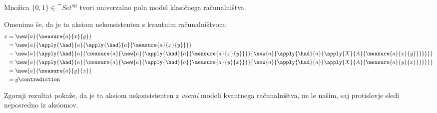 \begin{proposition}
    Množica \(\{0,1\} ∈ \cat{Set}^{\textrm{op}}\) tvori univerzalno poln model klasičnega računalništva.
\end{proposition}

Omenimo še, da je ta aksiom nekonsistenten s kvantnim računalništvom:
\begin{align*}
    x &= \new{a}{\measure{a}{x}{y}}\\
      &= \new{a}{\apply{\had}{a}{\apply{\had}{a}{\measure{a}{x}{y}}}}\\
      &= \new{a}{\apply{\had}{a}{\measure{a}{
            \new{a}{\apply{\had}{a}{             \measure{a}{x}{y}}}}{
            \new{a}{\apply{\had}{a}{\apply{X}{A}{\measure{a}{x}{y}}}}
        }}}\\
      &= \new{a}{\apply{\had}{a}{\measure{a}{
            \new{a}{\apply{\had}{a}{             \measure{a}{y}{x}}}}{
            \new{a}{\apply{\had}{a}{\apply{X}{A}{\measure{a}{y}{x}}}}
        }}}\\
      &= \new{a}{\measure{a}{y}{x}}\\
      &= y \contradiction
\end{align*}
\begin{remark}
    Zgornji rezultat pokaže, da je ta aksiom nekonsistenten z \emph{vsemi} modeli kvantnega računalništva, ne le našim, saj protislovje sledi neposredno iz aksiomov.
\end{remark}

